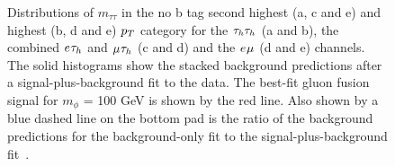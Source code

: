 \begin{figure}[p!]
\caption[Plots of the $m_{\tau\tau}$ distributions in the low-mass optimisation categories.]{Distributions of $m_{\tau\tau}$ in the no b tag second highest (a, c and e) and highest (b, d and e) $p_{T}$ category for the $\tau_{h}\tau_{h}$ (a and b), the combined $e_{}\tau_{h}$ and $\mu_{}\tau_{h}$ (c and d) and the $e_{}\mu_{}$ (d and e) channels. The solid histograms show the stacked background predictions after a signal-plus-background fit to the data. The best-fit gluon fusion signal for $m_{\phi}$ = 100 GeV is shown by the red line. Also shown by a blue dashed line on the bottom pad is the ratio of the background predictions for the background-only fit to the signal-plus-background fit~\cite{CMS:2022rbd}. }
\label{fig:low_mass_postfit}
\end{figure}

